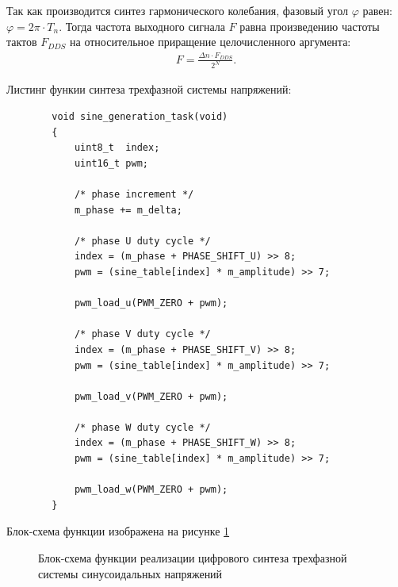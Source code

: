         Так как производится синтез гармонического колебания, фазовый угол
        $\varphi$ равен: $\varphi = 2\pi \cdot T_n$. Тогда частота выходного
        сигнала $F$ равна произведению частоты тактов $F_{DDS}$ на относительное
        приращение целочисленного аргумента:
        \begin{gather*}
            F = \frac{\Delta n \cdot F_{DDS}}{2^N}.
        \end{gather*}

        Листинг функии синтеза трехфазной системы напряжений:
        \begin{verbatim}
        void sine_generation_task(void)
        {
            uint8_t  index;
            uint16_t pwm;

            /* phase increment */
            m_phase += m_delta;
         
            /* phase U duty cycle */
            index = (m_phase + PHASE_SHIFT_U) >> 8;
            pwm = (sine_table[index] * m_amplitude) >> 7;

            pwm_load_u(PWM_ZERO + pwm);

            /* phase V duty cycle */
            index = (m_phase + PHASE_SHIFT_V) >> 8;
            pwm = (sine_table[index] * m_amplitude) >> 7;

            pwm_load_v(PWM_ZERO + pwm);

            /* phase W duty cycle */
            index = (m_phase + PHASE_SHIFT_W) >> 8;
            pwm = (sine_table[index] * m_amplitude) >> 7;

            pwm_load_w(PWM_ZERO + pwm);
        }
        \end{verbatim}

        Блок-схема функции изображена на рисунке \ref{fig:bs-dds}

        \begin{figure}[h!]
            \caption{Блок-схема функции реализации цифрового синтеза трехфазной
                системы синусоидальных напряжений}
            \label{fig:bs-dds}
        \end{figure}

